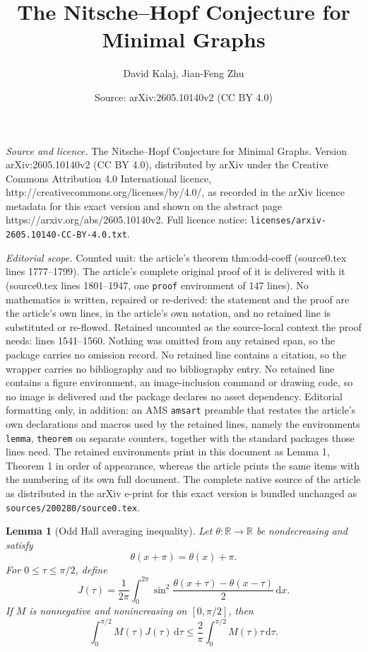 \documentclass[10pt,a4paper]{amsart}
\title{The Nitsche--Hopf Conjecture for Minimal Graphs}
\author{David Kalaj, Jian-Feng Zhu}
\date{Source: arXiv:2605.10140v2 (CC BY 4.0)}
\newtheorem{lemma}{Lemma}
\newcommand{\dd}{\mathrm d}
\begin{document}
\maketitle

\noindent\emph{Source and licence.} The Nitsche--Hopf Conjecture for Minimal Graphs. Version arXiv:2605.10140v2 (CC BY 4.0), distributed by arXiv under the Creative Commons Attribution 4.0 International licence, http://creativecommons.org/licenses/by/4.0/, as recorded in the arXiv licence metadata for this exact version and shown on the abstract page https://arxiv.org/abs/2605.10140v2. Full licence notice: \texttt{licenses/arxiv-2605.10140-CC-BY-4.0.txt}.\par\smallskip

\noindent\textit{Editorial scope.} Counted unit: the article's theorem thm:odd-coeff (source0.tex lines 1777--1799). The article's complete original proof of it is delivered with it (source0.tex lines 1801--1947, one \texttt{proof} environment of 147 lines). No mathematics is written, repaired or re-derived: the statement and the proof are the article's own lines, in the article's own notation, and no retained line is substituted or re-flowed.  Retained uncounted as the source-local context the proof needs: lines 1541--1560.  Nothing was omitted from any retained span, so the package carries no omission record.  No retained line contains a citation, so the wrapper carries no bibliography and no bibliography entry.  No retained line contains a figure environment, an image-inclusion command or drawing code, so no image is delivered and the package declares no asset dependency.  Editorial formatting only, in addition: an AMS \texttt{amsart} preamble that restates the article's own declarations and macros used by the retained lines, namely the environments \texttt{lemma}, \texttt{theorem} on separate counters, together with the standard packages those lines need.  The retained environments print in this document as Lemma 1, Theorem 1 in order of appearance, whereas the article prints the same items with the numbering of its own full document.  The complete native source of the article as distributed in the arXiv e-print for this exact version is bundled unchanged as \texttt{sources/200280/source0.tex}.
\begin{lemma}[Odd Hall averaging inequality]\label{lem:odd-Hall}
Let $\theta:\mathbb R\to\mathbb R$ be nondecreasing and satisfy
\[
        \theta(x+\pi)=\theta(x)+\pi .
\]
For $0\leq \tau\leq \pi/2$, define
\[
        J(\tau)
        =
        \frac1{2\pi}\int_0^{2\pi}
        \sin^2\frac{\theta(x+\tau)-\theta(x-\tau)}2\,\dd x .
\]
If $M$ is nonnegative and nonincreasing on $[0,\pi/2]$, then
\[
        \int_0^{\pi/2} M(\tau)J(\tau)\,\dd\tau
        \leq
        \frac2\pi
        \int_0^{\pi/2} M(\tau)\tau\,\dd\tau .
\]
\end{lemma}
\end{document}
